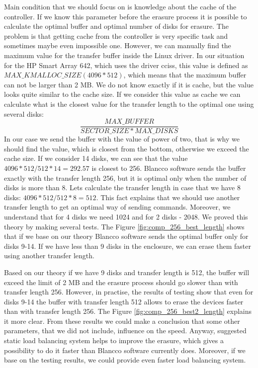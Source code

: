 Main condition that we should focus on is knowledge about the cache of the controller. If we know this parameter before the erasure process it is possible to calculate the optimal buffer and optimal number of disks for erasure. The problem is that getting cache from the controller is very specific task and sometimes maybe even impossible one. However, we can manually find the maximum value for the transfer buffer inside the Linux driver. In our situation for the HP Smart Array 642, which uses the driver cciss, this value is defined as $MAX\_KMALLOC\_SIZE (4096*512)$, which means that the maximum buffer can not be larger than 2 MB. We do not know exactly if it is cache, but the value looks quite similar to the cache size. If we consider this value as cache we can calculate what is the closest value for the transfer length to the optimal one using several disks:
\begin{equation}
\label{eq:optimal_length}
	\frac{MAX\_BUFFER}{SECTOR\_SIZE*MAX\_DISKS} 
\end{equation}
In our case we send the buffer with the value of power of two, that is why we should find the value, which is closest from the bottom, otherwise we exceed the cache size. If we consider 14 disks, we can see that the value $4096*512/512*14=292.57$ is closest to 256. Blancco software sends the buffer exactly with the transfer length 256, but it is optimal only when the number of disks is more than 8. Lets calculate the transfer length in case that we have 8 disks: $4096*512/512*8 = 512$.
This fact explains that we should use another transfer length to get an optimal way of sending commands. Moreover, we understand that for 4 disks we need 1024 and for 2 disks - 2048. We proved this theory by making several tests. The Figure \ref{fig:comp_256_best_length} shows that if we base on our theory Blancco software sends the optimal buffer only for disks 9-14. If we have less than 9 disks in the enclosure, we can erase them faster using another transfer length.

Based on our theory if we have 9 disks and transfer length is 512, the buffer will exceed the limit of 2 MB and the erasure process should go slower than with transfer length 256. However, in practise, the results of testing show that even for disks 9-14 the buffer with transfer length 512 allows to erase the devices faster than with transfer length 256. The Figure \ref{fig:comp_256_best2_length} explains it more clear. From these results we could make a conclusion that some other parameters, that we did not include, influence on the speed. Anyway, suggested static load balancing system helps to improve the erasure, which gives a possibility to do it faster than Blancco software currently does. Moreover, if we base on the testing results, we could provide even faster load balancing system.

